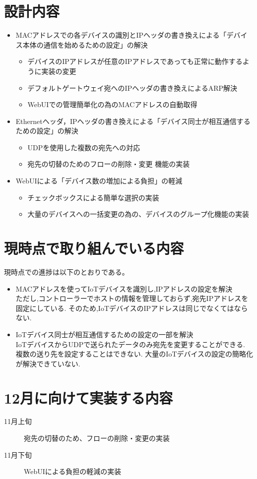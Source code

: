 \documentclass{jsarticle}
\begin{document}
\section{設計内容}
	\begin{itemize}
		\item MACアドレスでの各デバイスの識別とIPヘッダの書き換えによる「デバイス本体の通信を始めるための設定」の解決
			\begin{itemize}
				\item デバイスのIPアドレスが任意のIPアドレスであっても正常に動作するように実装の変更
				\item デフォルトゲートウェイ宛へのIPヘッダの書き換えによるARP解決
				\item WebUIでの管理簡単化の為のMACアドレスの自動取得
			\end{itemize}
		\item Ethernetヘッダ，IPヘッダの書き換えによる「デバイス同士が相互通信するための設定」の解決
			\begin{itemize}
				\item UDPを使用した複数の宛先への対応
				\item 宛先の切替のためのフローの削除・変更 機能の実装
			\end{itemize}
		\item WebUIによる「デバイス数の増加による負担」の軽減
			\begin{itemize}
				\item チェックボックスによる簡単な選択の実装
				\item 大量のデバイスへの一括変更の為の、デバイスのグループ化機能の実装
			\end{itemize}
	\end{itemize}

\section{現時点で取り組んでいる内容}
	現時点での進捗は以下のとおりである。
	\begin{itemize}
		\item MACアドレスを使ってIoTデバイスを識別し,IPアドレスの設定を解決\\
			ただし,コントローラーでホストの情報を管理しておらず,宛先IPアドレスを固定にしている.
			そのため,IoTデバイスのIPアドレスは同じでなくてはならない.
		\item IoTデバイス同士が相互通信するための設定の一部を解決\\
			IoTデバイスからUDPで送られたデータのみ宛先を変更することができる.
			複数の送り先を設定することはできない.
			大量のIoTデバイスの設定の簡略化が解決できていない.
	\end{itemize}

\section{12月に向けて実装する内容}
	\begin{description}
		\item[11月上旬] 宛先の切替のため、フローの削除・変更の実装
		\item[11月下旬] WebUIによる負担の軽減の実装
	\end{description}
	
\end{document}
